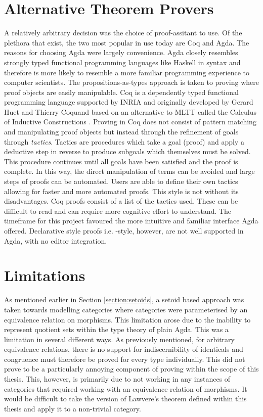 
\section{Alternative Theorem Provers}
\label{sec:altthmprov}
A relatively arbitrary decision was the choice of proof-assitant to use. Of the
plethora that exist, the two most popular in use today are Coq
\cite{coq}
and Agda. The reasons for choosing Agda were largely convenience. Agda
closely resembles strongly typed functional programming languages like Haskell
in syntax and therefore is more likely to resemble a more familiar programming
experience to computer scientists. The propositions-as-types approach is taken
to proving where proof objects are easily manipulable. Coq is a dependently
typed functional programming language supported by INRIA and originally
developed by Gerard Huet and Thierry Coquand based on an alternative to MLTT
called the Calculus of Inductive Constructions \cite{pfenning1989inductively}. Proving in Coq does not consist
of pattern matching and manipulating proof objects but instead through the
refinement of goals through \textit{tactics}. Tactics are procedures which take
a goal (proof) and apply a deductive step in reverse to produce subgoals which
themselves must be solved. This procedure continues until all goals have been
satisfied and the proof is complete. In this way, the direct manipulation of
terms can be avoided and large steps of proofs can be automated. Users are able
to define their own tactics allowing for faster and more automated proofs. This
style is not without its disadvantages. Coq proofs consist of a list of
the tactics used. These can be difficult to read and can require more cognitive
effort to understand. The timeframe for this project favoured the more intuitive
and familiar interface Agda offered. Declarative style proofs i.e.
-style, however, are not well supported in Agda, with no editor
integration.

\section{Limitations}
As mentioned earlier in Section \ref{section:setoids}, a setoid based approach
was taken towards modelling categories where categories were parameterised by an
equivalence relation on morphisms. This limitation arose due to the inability to
represent quotient sets within the type theory of plain Agda. This was a
limitation in several different ways. As previously mentioned, for arbitrary
equivalence relations, there is no support for indiscernibility of identicals and
congruence must therefore be proved for every type individually. This did not
prove to be a particularly annoying component of proving within the scope of
this thesis.  This, however, is primarily due to not working in any instances of
categories that required working with an equivalence relation of morphisms. It
would be difficult to take the version of Lawvere's theorem defined within this
thesis and apply it to a non-trivial category.

